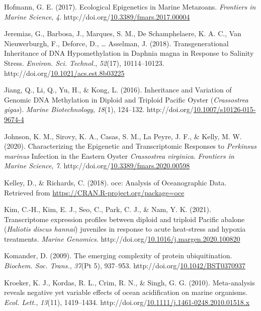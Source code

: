 \documentclass [11pt, proquest] {uwthesis}[2015/03/03]
\newlength{\cslhangindent}
\newenvironment{CSLReferences}%
{\setlength{\parindent}{0pt}%
\everypar{\setlength{\hangindent}{\cslhangindent}}\ignorespaces}%
{\par}
\begin{document}
\begin{CSLReferences}{1}{0}
\leavevmode\hypertarget{ref-Hofmann2017}{}%
Hofmann, G. E. (2017). {Ecological Epigenetics in Marine Metazoans}. \emph{Frontiers in Marine Science}, \emph{4}. http://doi.org/\href{https://doi.org/10.3389/fmars.2017.00004}{10.3389/fmars.2017.00004}

\leavevmode\hypertarget{ref-Jeremias2018}{}%
Jeremias, G., Barbosa, J., Marques, S. M., De Schamphelaere, K. A. C., Van Nieuwerburgh, F., Deforce, D., \ldots{} Asselman, J. (2018). {Transgenerational Inheritance of DNA Hypomethylation in Daphnia magna in Response to Salinity Stress}. \emph{Environ. Sci. Technol.}, \emph{52}(17), 10114--10123. http://doi.org/\href{https://doi.org/10.1021/acs.est.8b03225}{10.1021/acs.est.8b03225}

\leavevmode\hypertarget{ref-Jiang2016}{}%
Jiang, Q., Li, Q., Yu, H., \& Kong, L. (2016). {Inheritance and Variation of Genomic DNA Methylation in Diploid and Triploid Pacific Oyster (\emph{Crassostrea gigas})}. \emph{Marine Biotechnology}, \emph{18}(1), 124--132. http://doi.org/\href{https://doi.org/10.1007/s10126-015-9674-4}{10.1007/s10126-015-9674-4}

\leavevmode\hypertarget{ref-Johnson2020}{}%
Johnson, K. M., Sirovy, K. A., Casas, S. M., La Peyre, J. F., \& Kelly, M. W. (2020). {Characterizing the Epigenetic and Transcriptomic Responses to \emph{Perkinsus marinus} Infection in the Eastern Oyster \emph{Crassostrea virginica}}. \emph{Frontiers in Marine Science}, \emph{7}. http://doi.org/\href{https://doi.org/10.3389/fmars.2020.00598}{10.3389/fmars.2020.00598}

\leavevmode\hypertarget{ref-Kelley2018}{}%
Kelley, D., \& Richards, C. (2018). {oce: Analysis of Oceanographic Data}. Retrieved from \url{https://CRAN.R-project.org/package=oce}

\leavevmode\hypertarget{ref-Kim2021}{}%
Kim, C.-H., Kim, E. J., Seo, C., Park, C. J., \& Nam, Y. K. (2021). {Transcriptome expression profiles between diploid and triploid Pacific abalone (\emph{Haliotis discus hannai}) juveniles in response to acute heat-stress and hypoxia treatments}. \emph{Marine Genomics}. http://doi.org/\href{https://doi.org/10.1016/j.margen.2020.100820}{10.1016/j.margen.2020.100820}

\leavevmode\hypertarget{ref-Komander2009}{}%
Komander, D. (2009). {The emerging complexity of protein ubiquitination}. \emph{Biochem. Soc. Trans.}, \emph{37}(Pt 5), 937--953. http://doi.org/\href{https://doi.org/10.1042/BST0370937}{10.1042/BST0370937}

\leavevmode\hypertarget{ref-Kroeker2010}{}%
Kroeker, K. J., Kordas, R. L., Crim, R. N., \& Singh, G. G. (2010). {Meta-analysis reveals negative yet variable effects of ocean acidification on marine organisms}. \emph{Ecol. Lett.}, \emph{13}(11), 1419--1434. http://doi.org/\href{https://doi.org/10.1111/j.1461-0248.2010.01518.x}{10.1111/j.1461-0248.2010.01518.x}


\end{CSLReferences}
\end{document}
